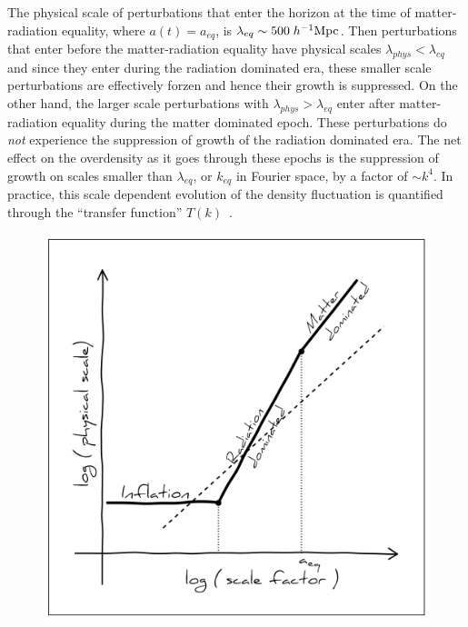 The physical scale of perturbations that enter the horizon at the time of 
matter-radiation equality, where $a(t) = a_{eq}$, is $\lambda_{eq} \sim 500\;h^{-1}{\rm Mpc}$.
Then perturbations that enter before the matter-radiation equality 
have physical scales $\lambda_{phys} < \lambda_{eq}$ and since they enter
during the radiation dominated era, these smaller scale perturbations 
are effectively forzen and hence their growth is suppressed.
On the other hand, the larger scale perturbations with $\lambda_{phys} > \lambda_{eq}$
enter after matter-radiation equality during the matter dominated epoch. These 
perturbations do {\em not} experience the suppression of growth of the radiation 
dominated era. The net effect on the overdensity as it goes through these epochs 
is the suppression of growth on scales smaller than $\lambda_{eq}$, or $k_{eq}$ in 
Fourier space, by a factor of $\sim k^4$. In practice, this scale dependent 
evolution of the density fluctuation is quantified through the 
``transfer function'' $T(k)$~\citep{Eisenstein:1998aa, Eisenstein:1999aa}. 

\begin{figure}
\begin{center}
\includegraphics[width=\textwidth]{figs/lifo.png}
\caption{
} \label{fig:lifo}
\end{center}
\end{figure}

